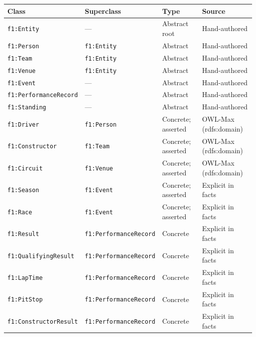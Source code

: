 \begin{center}
\begin{tabularx}{\linewidth}{@{}lllX@{}}
\toprule
\textbf{Class} & \textbf{Superclass} & \textbf{Type} & \textbf{Source} \\
\midrule
\texttt{f1:Entity}              & —                      & Abstract root     & Hand-authored \\
\texttt{f1:Person}              & \texttt{f1:Entity}     & Abstract          & Hand-authored \\
\texttt{f1:Team}                & \texttt{f1:Entity}     & Abstract          & Hand-authored \\
\texttt{f1:Venue}               & \texttt{f1:Entity}     & Abstract          & Hand-authored \\
\texttt{f1:Event}               & —                      & Abstract          & Hand-authored \\
\texttt{f1:PerformanceRecord}   & —                      & Abstract          & Hand-authored \\
\texttt{f1:Standing}            & —                      & Abstract          & Hand-authored \\
\midrule
\texttt{f1:Driver}              & \texttt{f1:Person}     & Concrete; asserted  & OWL-Max (rdfs:domain) \\
\texttt{f1:Constructor}         & \texttt{f1:Team}       & Concrete; asserted  & OWL-Max (rdfs:domain) \\
\texttt{f1:Circuit}             & \texttt{f1:Venue}      & Concrete; asserted  & OWL-Max (rdfs:domain) \\
\texttt{f1:Season}              & \texttt{f1:Event}      & Concrete; asserted  & Explicit in facts \\
\texttt{f1:Race}                & \texttt{f1:Event}      & Concrete; asserted  & Explicit in facts \\
\texttt{f1:Result}              & \texttt{f1:PerformanceRecord} & Concrete   & Explicit in facts \\
\texttt{f1:QualifyingResult}    & \texttt{f1:PerformanceRecord} & Concrete   & Explicit in facts \\
\texttt{f1:LapTime}             & \texttt{f1:PerformanceRecord} & Concrete   & Explicit in facts \\
\texttt{f1:PitStop}             & \texttt{f1:PerformanceRecord} & Concrete   & Explicit in facts \\
\texttt{f1:ConstructorResult}   & \texttt{f1:PerformanceRecord} & Concrete   & Explicit in facts \\

\end{tabularx}
\end{center}
